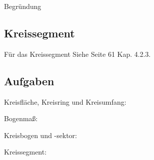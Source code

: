 Begründung

\subsection{Kreissegment}

Für das Kreissegment Siehe \cite{marthaler20geom} Seite 61 Kap. 4.2.3.



\newpage
\subsection*{Aufgaben}

Kreisfläche, Kreisring und Kreisumfang:


Bogenmaß:


Kreisbogen und -sektor:



Kreissegment:




